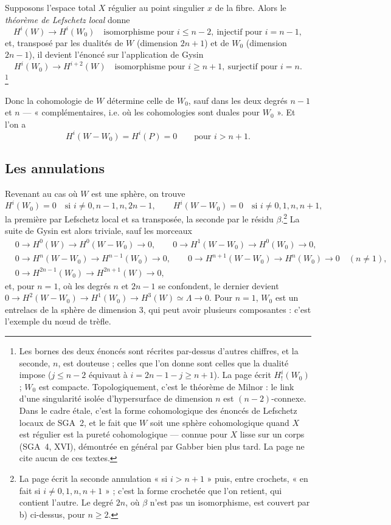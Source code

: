 \documentclass[11pt,a4paper]{article}
\begin{document}
Supposons l'espace total $X$ régulier au point singulier $x$ de la fibre. Alors
le \emph{théorème de Lefschetz local} donne
\[
  H^{i}(W) \longrightarrow H^{i}(W_0) \quad
  \text{isomorphisme pour } i \leq n-2, \ \text{injectif pour } i = n-1,
\]
et, transposé par les dualités de $W$ (dimension $2n+1$) et de $W_0$
(dimension $2n-1$), il devient l'énoncé sur l'application de Gysin
\[
  H^{i}(W_0) \longrightarrow H^{i+2}(W) \quad
  \text{isomorphisme pour } i \geq n+1, \ \text{surjectif pour } i = n .
\]
\footnote{Les bornes des deux énoncés sont récrites par-dessus d'autres
chiffres, et la seconde, $n$, est douteuse ; celles que l'on donne sont celles
que la dualité impose ($j \leq n-2$ équivaut à $i = 2n-1-j \geq n+1$). La page
écrit $H^{i}_{!}(W_0)$ ; $W_0$ est compacte. Topologiquement, c'est le
théorème de Milnor : le link d'une singularité isolée d'hypersurface de
dimension $n$ est $(n-2)$-connexe. Dans le cadre étale, c'est la forme
cohomologique des énoncés de Lefschetz locaux de SGA~2, et le fait que $W$
soit une sphère cohomologique quand $X$ est régulier est la pureté
cohomologique — connue pour $X$ lisse sur un corps (SGA~4, XVI), démontrée en
général par Gabber bien plus tard. La page ne cite aucun de ces textes.}

Donc la cohomologie de $W$ détermine celle de $W_0$, sauf dans les deux degrés
$n-1$ et $n$ — « complémentaires, i.e. où les cohomologies sont duales pour
$W_0$ ». Et l'on a
\[
  H^{i}(W - W_0) = H^{i}(P) = 0 \qquad \text{pour } i > n+1 .
\]

\subsection*{Les annulations}

Revenant au cas où $W$ est une sphère, on trouve
\[
  H^{i}(W_0) = 0 \quad \text{si } i \neq 0, n-1, n, 2n-1, \qquad
  H^{i}(W - W_0) = 0 \quad \text{si } i \neq 0, 1, n, n+1,
\]
la première par Lefschetz local et sa transposée, la seconde par le résidu
$\beta$.\footnote{La page écrit la seconde annulation « si $i > n+1$ » puis,
entre crochets, « en fait si $i \neq 0, 1, n, n+1$ » ; c'est la forme
crochetée que l'on retient, qui contient l'autre. Le degré $2n$, où $\beta$
n'est pas un isomorphisme, est couvert par b) ci-dessus, pour $n \geq 2$.} La
suite de Gysin est alors triviale, sauf les morceaux
\[
  \begin{aligned}
    &0 \to H^{0}(W) \to H^{0}(W - W_0) \to 0, \qquad
     0 \to H^{1}(W - W_0) \to H^{0}(W_0) \to 0, \\
    &0 \to H^{n}(W - W_0) \to H^{n-1}(W_0) \to 0, \qquad
     0 \to H^{n+1}(W - W_0) \to H^{n}(W_0) \to 0 \quad (n \neq 1), \\
    &0 \to H^{2n-1}(W_0) \to H^{2n+1}(W) \to 0,
  \end{aligned}
\]
et, pour $n = 1$, où les degrés $n$ et $2n-1$ se confondent, le dernier
devient
$0 \to H^{2}(W - W_0) \to H^{1}(W_0) \to H^{3}(W) \simeq \Lambda \to 0$.
Pour $n = 1$, $W_0$ est un entrelacs de la sphère de dimension $3$, qui peut
avoir plusieurs composantes : c'est l'exemple du nœud de trèfle.
\end{document}
